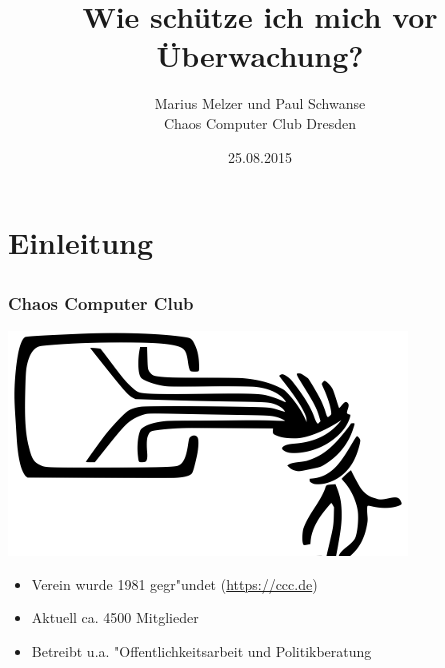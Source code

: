 \documentclass[12pt]{beamer}
\title{Wie schütze ich mich vor Überwachung?}
\author{\small Marius Melzer und Paul Schwanse\\\large Chaos Computer Club Dresden}
\date{25.08.2015}
\begin{document}
\maketitle

\section{Einleitung}
\subsection{}

\begin{frame}
    \frametitle{Chaos Computer Club}
    \begin{center}
	\includegraphics[height=0.2\textheight]{img/chaosknoten.png}
    \end{center}	
    \begin{itemize}
      \item<1-> Verein wurde 1981 gegr"undet (\url{https://ccc.de})          
      \item<2-> Aktuell ca. 4500 Mitglieder
      \item<3-> Betreibt u.a. "Offentlichkeitsarbeit und Politikberatung      
    \end{itemize}
\end{frame}
\end{document}
